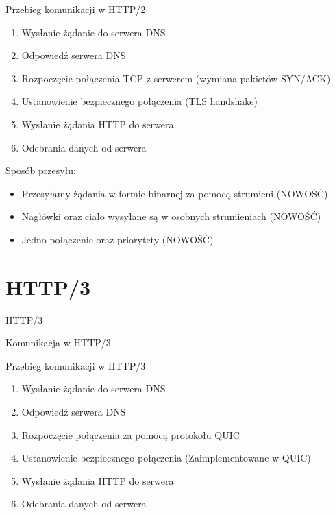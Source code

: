\documentclass{beamer}
\begin{document}
\begin{frame}{Przebieg komunikacji w HTTP/2}
    \begin{enumerate}
        \item Wysłanie żądanie do serwera DNS
        \item Odpowiedź serwera DNS
        \item Rozpoczęcie połączenia TCP z serwerem (wymiana pakietów SYN/ACK)
        \item Ustanowienie bezpiecznego połączenia (TLS handshake)
        \item Wysłanie żądania HTTP do serwera
        \item Odebrania danych od serwera
    \end{enumerate}
    
    \pause
    
    \vspace{15pt}
    
    \begin{large}
    Sposób przesyłu:
    \end{large}
    \begin{itemize}
        \item Przesyłamy żądania w formie binarnej za pomocą strumieni (NOWOŚĆ)
        \item Nagłówki oraz ciało wysyłane są w osobnych strumieniach (NOWOŚĆ)
        \item Jedno połączenie oraz priorytety (NOWOŚĆ)
    \end{itemize}
\end{frame}

\section{HTTP/3}
\begin{frame}{HTTP/3}
    \begin{center}
        \begin{Huge}
           Komunikacja w HTTP/3
        \end{Huge}
    \end{center}
\end{frame}

\begin{frame}{Przebieg komunikacji w HTTP/3}
    \begin{enumerate}
        \item Wysłanie żądanie do serwera DNS
        \item Odpowiedź serwera DNS
        \item Rozpoczęcie połączenia za pomocą protokołu QUIC
        \item Ustanowienie bezpiecznego połączenia (Zaimplementowane w QUIC)
        \item Wysłanie żądania HTTP do serwera
        \item Odebrania danych od serwera
    \end{enumerate}
\end{frame}
\end{document}

